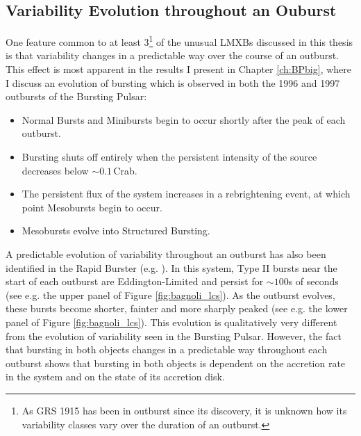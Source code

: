 \subsection{Variability Evolution throughout an Ouburst}

\par One feature common to at least 3\footnote{As GRS 1915 has been in outburst since its discovery, it is unknown how its variability classes vary over the duration of an outburst.} of the unusual LMXBs discussed in this thesis is that variability changes in a predictable way over the course of an outburst.  This effect is most apparent in the results I present in Chapter \ref{ch:BPbig}, where I discuss an evolution of bursting which is observed in both the 1996 and 1997 outbursts of the Bursting Pulsar:
\begin{itemize}
\item Normal Bursts and Minibursts begin to occur shortly after the peak of each outburst.
\item Bursting shuts off entirely when the persistent intensity of the source decreases below $\sim0.1$\,Crab.
\item The persistent flux of the system increases in a rebrightening event, at which point Mesobursts begin to occur.
\item Mesobursts evolve into Structured Bursting.
\end{itemize}
\par A predictable evolution of variability throughout an outburst has also been identified in the Rapid Burster (e.g. \citealp{Bagnoli_PopStudy}).  In this system, Type II bursts near the start of each outburst are Eddington-Limited and persist for $\sim100$s of seconds (see e.g. the upper panel of Figure \ref{fig:bagnoli_lcs}).  As the outburst evolves, these bursts become shorter, fainter and more sharply peaked (see e.g. the lower panel of Figure \ref{fig:bagnoli_lcs}).  This evolution is qualitatively very different from the evolution of variability seen in the Bursting Pulsar.  However, the fact that bursting in both objects changes in a predictable way throughout each outburst shows that bursting in both objects is dependent on the accretion rate in the system and on the state of its accretion disk.
